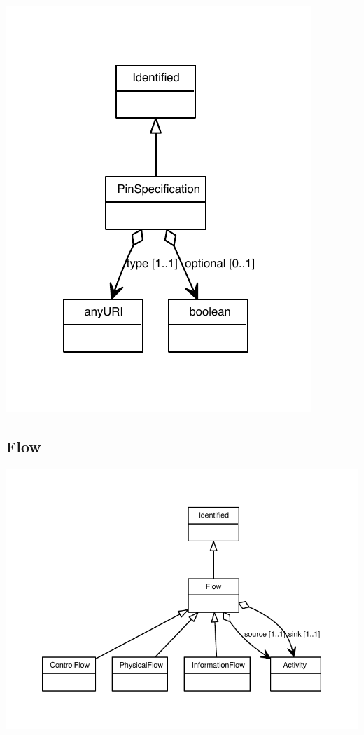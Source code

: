 \begin{center}
\includegraphics[scale=0.8]{uml/PinSpecification_abstraction_hierarchy.pdf}
\end{center}


\subsection{Flow}
\label{sec:Flow}



\begin{center}
\includegraphics[scale=0.8]{uml/Flow_abstraction_hierarchy.pdf}
\end{center}


